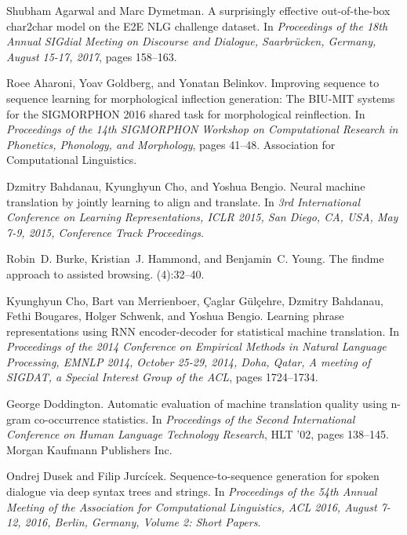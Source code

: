 \documentclass[runningheads, envcountsame, a4paper]{llncs}
\begin{document}
\begin{thebibliography}{10}

Shubham Agarwal and Marc Dymetman.
\newblock A surprisingly effective out-of-the-box char2char model on the {E2E}
  {NLG} challenge dataset.
\newblock In {\em Proceedings of the 18th Annual SIGdial Meeting on Discourse
  and Dialogue, Saarbr{ü}cken, Germany, August 15-17, 2017}, pages 158--163.

Roee Aharoni, Yoav Goldberg, and Yonatan Belinkov.
\newblock Improving sequence to sequence learning for morphological inflection
  generation: The {BIU}-{MIT} systems for the {SIGMORPHON} 2016 shared task for
  morphological reinflection.
\newblock In {\em Proceedings of the 14th {SIGMORPHON} Workshop on
  Computational Research in Phonetics, Phonology, and Morphology}, pages
  41--48. Association for Computational Linguistics.

Dzmitry Bahdanau, Kyunghyun Cho, and Yoshua Bengio.
\newblock Neural machine translation by jointly learning to align and
  translate.
\newblock In {\em 3rd International Conference on Learning Representations,
  {ICLR} 2015, San Diego, CA, USA, May 7-9, 2015, Conference Track
  Proceedings}.

Robin~D. Burke, Kristian~J. Hammond, and Benjamin~C. Young.
\newblock The findme approach to assisted browsing.
(4):32--40.

Kyunghyun Cho, Bart van Merrienboer, Çaglar Gülçehre, Dzmitry Bahdanau,
  Fethi Bougares, Holger Schwenk, and Yoshua Bengio.
\newblock Learning phrase representations using {RNN} encoder-decoder for
  statistical machine translation.
\newblock In {\em Proceedings of the 2014 Conference on Empirical Methods in
  Natural Language Processing, {EMNLP} 2014, October 25-29, 2014, Doha, Qatar,
  {A} meeting of SIGDAT, a Special Interest Group of the {ACL}}, pages
  1724--1734.

George Doddington.
\newblock Automatic evaluation of machine translation quality using n-gram
  co-occurrence statistics.
\newblock In {\em Proceedings of the Second International Conference on Human
  Language Technology Research}, HLT '02, pages 138--145. Morgan Kaufmann
  Publishers Inc.

Ondrej Dusek and Filip Jurcícek.
\newblock Sequence-to-sequence generation for spoken dialogue via deep syntax
  trees and strings.
\newblock In {\em Proceedings of the 54th Annual Meeting of the Association for
  Computational Linguistics, {ACL} 2016, August 7-12, 2016, Berlin, Germany,
  Volume 2: Short Papers}.


\end{thebibliography}
\end{document}
